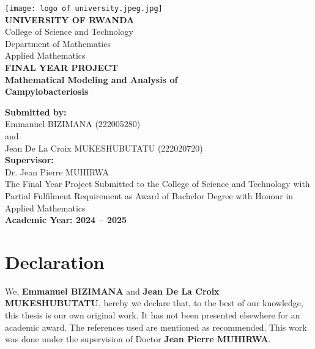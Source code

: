 \documentclass[a4paper,12pt]{report}
\begin{document}
\let\cleardoublepage\clearpage
\begin{titlepage}
    \centering
    \texttt{[image: logo of university.jpeg.jpg]} \\[1cm]
    
    {\Large \textbf{UNIVERSITY OF RWANDA}}\\[0.5cm]
    {\large College of Science and Technology} \\[0.2cm]
    {\large Department of Mathematics} \\[0.2cm]
    {\large Applied Mathematics} \\[1cm]
    
    {\Large \textbf{FINAL YEAR PROJECT}} \\[1cm]
    
    {\LARGE \textbf{Mathematical Modeling and Analysis of}}\\[0.3cm]
    {\LARGE \textbf{Campylobacteriosis}} \\[1cm]
    
    \vfill
    
    \textbf{Submitted by:} \\
    Emmanuel BIZIMANA (222005280) \\
    and \\
    Jean De La Croix MUKESHUBUTATU (222020720)\\[1cm]
    
    \textbf{Supervisor:} \\
    Dr. Jean Pierre MUHIRWA\\[2cm]
 
    The Final Year Project Submitted to the College of Science and Technology with Partial Fulfilment Requirement as Award of Bachelor Degree with Honour in Applied Mathematics\\[1cm]
    
    \textbf{Academic Year: 2024 -- 2025}
\end{titlepage}





    \chapter*{ Declaration}



\vspace{1em}

We, \textbf{Emmanuel BIZIMANA} and  \textbf{Jean De La Croix MUKESHUBUTATU}, hereby we declare that, to the best of our knowledge, this thesis is our own original work. It has not been presented elsewhere for an academic award. The references used are mentioned as recommended. This work was done under the supervision of Doctor \textbf{Jean Pierre MUHIRWA}.
\end{document}
